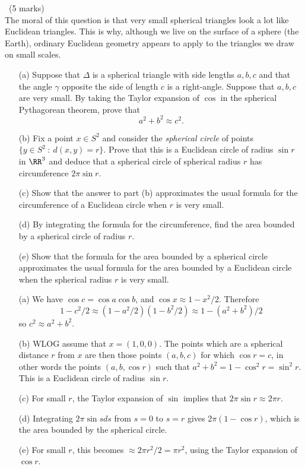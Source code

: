 \documentclass[12pt]{article}
\begin{document}
\begin{question}\ (5 marks)\\
  The moral of this question is that very small spherical triangles look a lot like Euclidean triangles. This is why, although we live on the surface of a sphere (the Earth), ordinary Euclidean geometry appears to apply to the triangles we draw on small scales.
  \begin{enumerate}
  \item[(a)] Suppose that $\Delta$ is a spherical triangle with side lengths $a,b,c$ and that the angle $\gamma$ opposite the side of length $c$ is a right-angle. Suppose that $a,b,c$ are very small. By taking the Taylor expansion of $\cos$ in the spherical Pythagorean theorem, prove that
    \[a^2+b^2\approx c^2.\]
  \item[(b)] Fix a point $x\in S^2$ and consider the {\em spherical circle} of points $\{y\in S^2\ :\ d(x,y)=r\}$. Prove that this is a Euclidean circle of radius $\sin r$ in $\RR^3$ and deduce that a spherical circle of spherical radius $r$ has circumference $2\pi\sin r$. 
  \item[(c)] Show that the answer to part (b) approximates the usual formula for the circumference of a Euclidean circle when $r$ is very small.
  \item[(d)] By integrating the formula for the circumference, find the area bounded by a spherical circle of radius $r$.
  \item[(e)] Show that the formula for the area bounded by a spherical circle approximates the usual formula for the area bounded by a Euclidean circle when the spherical radius $r$ is very small.
  \end{enumerate}
\end{question}
\begin{answer}
  \begin{enumerate}
  \item[(a)] We have $\cos c=\cos a \cos b$, and $\cos x\approx 1-x^2/2$. Therefore
    \[1-c^2/2\approx (1-a^2/2)(1-b^2/2)\approx 1-(a^2+b^2)/2\]
    so $c^2\approx a^2+b^2$.
  \item[(b)] WLOG assume that $x=(1,0,0)$. The points which are a spherical distance $r$ from $x$ are then those points $(a,b,c)$ for which $\cos r=c$, in other words the points $(a,b,\cos r)$ such that $a^2+b^2=1-\cos^2r=\sin^2r$. This is a Euclidean circle of radius $\sin r$.
  \item[(c)] For small $r$, the Taylor expansion of $\sin$ implies that $2\pi\sin r\approx 2\pi r$.
  \item[(d)] Integrating $2\pi\sin s ds$ from $s=0$ to $s=r$ gives $2\pi(1-\cos r)$, which is the area bounded by the spherical circle.
  \item[(e)] For small $r$, this becomes $\approx 2\pi r^2/2=\pi r^2$, using the Taylor expansion of $\cos r$.
  \end{enumerate}
\end{answer}
\end{document}
